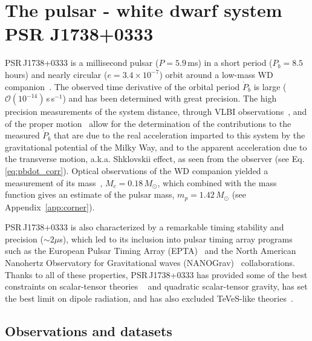 \documentclass[
    floats,
    floatfix,
    amssymb,
    prd,
    twocolumn,
    superscriptaddress,
    nofootinbib,
    unicode,
    colorlinks=true,
    linktocpage=true
]{revtex4-2}
\begin{document}
\section{The pulsar - white dwarf system PSR J1738+0333}
\label{sec:obs_and_dataset}

PSR\,J1738+0333 is a millisecond pulsar ($P=5.9$\,ms) in a short period ($P_b=8.5$\,hours) and nearly circular ($e=3.4\times10^{-7}$) orbit around a low-mass WD companion~\cite{Freire:2007sb, Antoniadis:2012vy}. The observed time derivative of the orbital period $\dot{P}_b$ is large ($\mathcal{O}(10^{-14})$\,s\,s$^{-1}$) and has been determined with great precision. The high precision measurements of the system distance, through VLBI observations~\cite{VLBI_2023}, and of the proper motion~\cite{Freire:2012} allow for the determination of the contributions to the measured $\dot{P}_b$ that are due to the real acceleration imparted to this system by the gravitational potential of the Milky Way, and to the apparent acceleration due to the transverse motion, a.k.a. Shklovskii effect, as seen from the observer (see Eq.\eqref{eq:pbdot_corr}). Optical observations of the WD companion yielded a measurement of its 
mass~\cite{Antoniadis:2012vy}, $M_c = 0.18\,M_\odot$, which combined with the 
mass function gives an estimate of the pulsar mass, $m_p = 1.42\,M_\odot$ (see Appendix~\ref{app:corner}).

PSR\,J1738+0333 is also characterized by a remarkable timing stability and precision ($\sim 2\mu$s), which led to its inclusion into pulsar timing array programs such as the European Pulsar Timing Array (EPTA)~\cite{EPTA:2016ndq} and the North American Nanohertz Observatory for Gravitational waves (NANOGrav)~\cite{NANOGrav:2023gor} collaborations. Thanks to all of these properties, PSR\,J1738+0333 has provided some of the best constraints on scalar-tensor theories ~\cite{BenSalem:2023xgy} and quadratic scalar-tensor gravity, has set the best limit on dipole radiation, and has also excluded TeVeS-like theories~\cite{Freire:2012}.

\subsection{Observations and datasets}
\end{document}
